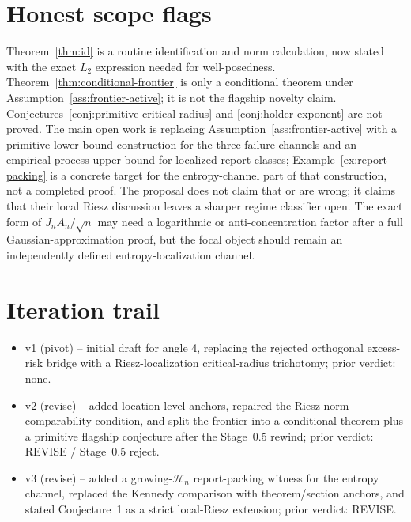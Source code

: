 \documentclass[11pt]{article}
\newcommand{\calH}{\mathcal{H}}
\theoremstyle{definition}
\theoremstyle{plain}
\theoremstyle{remark}
\begin{document}
\section{Honest scope flags}
Theorem~\ref{thm:id} is a routine identification and norm calculation, now
stated with the exact \(L_2\) expression needed for well-posedness.
Theorem~\ref{thm:conditional-frontier} is only a conditional theorem under
Assumption~\ref{ass:frontier-active}; it is not the flagship novelty claim.
Conjectures~\ref{conj:primitive-critical-radius} and
\ref{conj:holder-exponent} are not proved.  The main open work is replacing
Assumption~\ref{ass:frontier-active} with a primitive lower-bound construction
for the three failure channels and an empirical-process upper bound for
localized report classes; Example~\ref{ex:report-packing} is a concrete target
for the entropy-channel part of that construction, not a completed proof.  The
proposal does not claim that
\citet{ChernozhukovNeweySingh2022Riesz} or
\citet{ChernozhukovNeweySingh2022AutoDML} are wrong; it claims that their
local Riesz discussion leaves a sharper regime classifier open.  The exact
form of \(J_nA_n/\sqrt n\) may need a logarithmic or anti-concentration factor
after a full Gaussian-approximation proof, but the focal object should remain
an independently defined entropy-localization channel.

\section{Iteration trail}
\begin{itemize}[leftmargin=*]
\item v1 (pivot) -- initial draft for angle 4, replacing the rejected
orthogonal excess-risk bridge with a Riesz-localization critical-radius
trichotomy; prior verdict: none.
\item v2 (revise) -- added location-level anchors, repaired the Riesz norm
comparability condition, and split the frontier into a conditional theorem
plus a primitive flagship conjecture after the Stage~0.5 rewind; prior
verdict: REVISE / Stage~0.5 reject.
\item v3 (revise) -- added a growing-\(\calH_n\) report-packing witness for
the entropy channel, replaced the Kennedy comparison with theorem/section
anchors, and stated Conjecture~1 as a strict local-Riesz extension; prior
verdict: REVISE.
\end{itemize}
\end{document}
